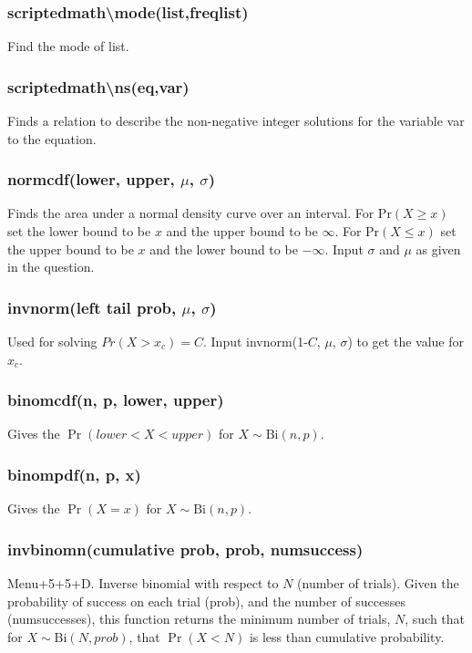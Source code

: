 \documentclass[a4paper,twoside,10pt]{article}
\begin{document}
			\subsubsection{scriptedmath\textbackslash mode(list,freqlist)} Find the mode of list.
			\subsubsection{scriptedmath\textbackslash ns(eq,var)} Finds a relation to describe the non-negative integer solutions for the variable var to the equation.
			
			\subsubsection{normcdf(lower, upper, $\mu$, $\sigma$)} Finds the area under a normal density curve over an interval. For $\mathrm{Pr}(X\geq x)$ set the lower bound to be $x$ and the upper bound to be $\infty$. For $\mathrm{Pr}(X\leq x)$ set the upper bound to be $x$ and the lower bound to be $-\infty$. Input $\sigma$ and $\mu$ as given in the question.
			
			\subsubsection{invnorm(left tail prob, $\mu$, $\sigma$)} Used for solving $Pr(X>x_c)=C$. Input invnorm(1-$C$, $\mu$, $\sigma$) to get the value for $x_c$.
			
			\subsubsection{binomcdf(n, p, lower, upper)} Gives the $\Pr(lower<X<upper)$ for $X\sim\mathrm{Bi}(n,p)$.
			
			\subsubsection{binompdf(n, p, x)} Gives the $\Pr(X=x)$ for $X\sim\mathrm{Bi}(n,p)$.
			
			\subsubsection{invbinomn(cumulative prob, prob, numsuccess)} Menu+5+5+D. Inverse binomial with respect to $N$ (number of trials). Given the probability of success on each trial (prob), and the number of successes (numsuccesses), this function returns the minimum number of trials, $N$, such that for $X\sim\mathrm{Bi}(N,prob)$, that $\Pr(X<N)$ is less than cumulative probability.
			
\end{document}
